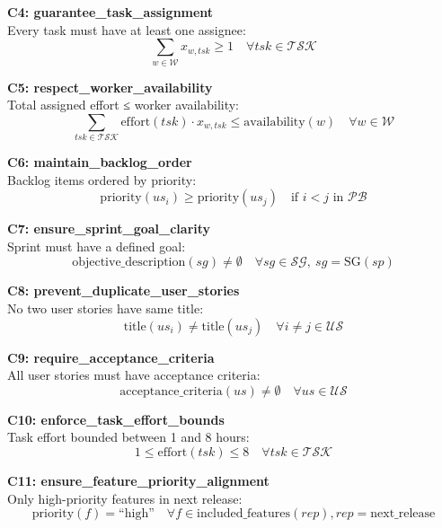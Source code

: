 \documentclass[12pt]{article}
\begin{document}
    \item \textbf{C4: guarantee\_task\_assignment} \\
    Every task must have at least one assignee:
    \[
    \sum_{w \in \mathcal{W}} x_{w,tsk} \geq 1 \quad \forall tsk \in \mathcal{TSK}
    \]

    \item \textbf{C5: respect\_worker\_availability} \\
    Total assigned effort ≤ worker availability:
    \[
    \sum_{tsk \in \mathcal{TSK}} \text{effort}(tsk) \cdot x_{w,tsk} \leq \text{availability}(w) \quad \forall w \in \mathcal{W}
    \]

    \item \textbf{C6: maintain\_backlog\_order} \\
    Backlog items ordered by priority:
    \[
    \text{priority}(us_i) \geq \text{priority}(us_j) \quad \text{if } i < j \text{ in } \mathcal{PB}
    \]

    \item \textbf{C7: ensure\_sprint\_goal\_clarity} \\
    Sprint must have a defined goal:
    \[
    \text{objective\_description}(sg) \neq \emptyset \quad \forall sg \in \mathcal{SG},\ sg = \text{SG}(sp)
    \]

    \item \textbf{C8: prevent\_duplicate\_user\_stories} \\
    No two user stories have same title:
    \[
    \text{title}(us_i) \neq \text{title}(us_j) \quad \forall i \neq j \in \mathcal{US}
    \]

    \item \textbf{C9: require\_acceptance\_criteria} \\
    All user stories must have acceptance criteria:
    \[
    \text{acceptance\_criteria}(us) \neq \emptyset \quad \forall us \in \mathcal{US}
    \]

    \item \textbf{C10: enforce\_task\_effort\_bounds} \\
    Task effort bounded between 1 and 8 hours:
    \[
    1 \leq \text{effort}(tsk) \leq 8 \quad \forall tsk \in \mathcal{TSK}
    \]

    \item \textbf{C11: ensure\_feature\_priority\_alignment} \\
    Only high-priority features in next release:
    \[
    \text{priority}(f) = \text{``high''} \quad \forall f \in \text{included\_features}(rep), rep = \text{next\_release}
    \]
\end{document}

